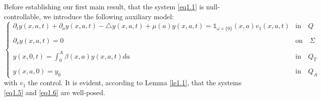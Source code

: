 \documentclass[10pt, a4]{amsart}
\theoremstyle{plain}
\theoremstyle{definition}
\theoremstyle{remark}
\numberwithin{equation}{section}
\begin{document}
Before establishing our first main result, that the system \eqref{eq1.1} is null-controllable, we introduce the following auxiliary model:
\begin{equation}\label{eq1.6} 
\left\lbrace 
\begin{array}{ll}
\partial_{t}y(x,a,t)+\partial_{a}y(x,a,t)-\triangle y(x,a,t)+\mu(a)y(x,a,t)=\mathds{1}_{\omega\times\lbrace 0\rbrace}(x,a)v_1(x,a,t) & \text{in}\quad Q\\
 \\\partial_{\nu}y(x,a,t)=0 & \text{on}\quad\Sigma\\
\\y(x,0,t)=\displaystyle\int_{0}^{A}\beta(x,a)y(x,a,t)da  & \text{in}\quad Q_{T}\\
 \\y(x,a,0)=y_{0}  & \text{in}\quad Q_{A}
\end{array}
\right.
\end{equation}
with $v_1$ the control.  It is evident, according to Lemma \ref{le1.1}, that the systems \eqref{eq1.5} and \eqref{eq1.6} are well-posed. %
\end{document}
